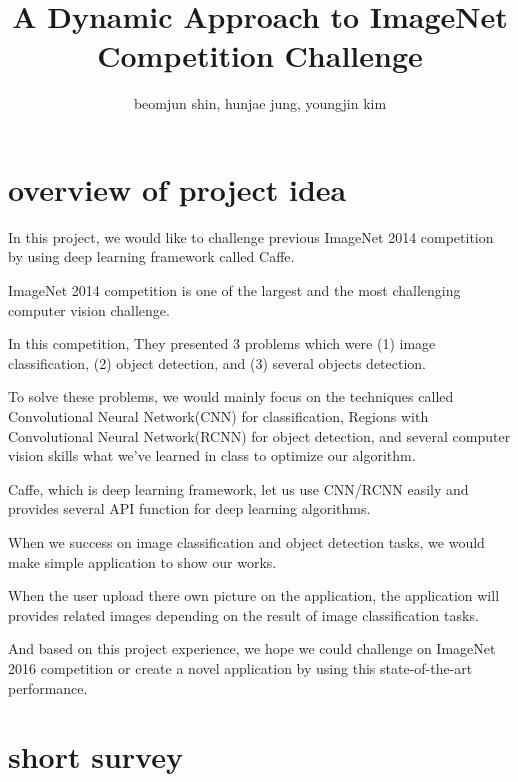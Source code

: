 

\title{A Dynamic Approach to ImageNet Competition Challenge}
\author{beomjun shin, hunjae jung, youngjin kim}

\newtheorem{qu}{Question}



\maketitle

\section{overview of project idea}

In this project, we would like to challenge previous ImageNet 2014 competition by using deep learning framework called Caffe. 

ImageNet 2014 competition is one of the largest and the most challenging computer vision challenge. 

In this competition, They presented 3 problems which were (1) image classification, (2) object detection, and (3) several objects detection. 

To solve these problems, we would mainly focus on the techniques called Convolutional Neural Network(CNN) for classification, Regions with Convolutional Neural Network(RCNN) for object detection, and several computer vision skills what we've learned in class to optimize our algorithm. 

Caffe, which is deep learning framework, let us use CNN/RCNN easily and provides several API function for deep learning algorithms. 

When we success on image classification and object detection tasks, we would make simple application to show our works. 

When the user upload there own picture on the application, the application will provides related images depending on the result of image classification tasks. 

And based on this project experience, we hope we could challenge on ImageNet 2016 competition or create a novel application by using this state-of-the-art performance.

\section{short survey}

